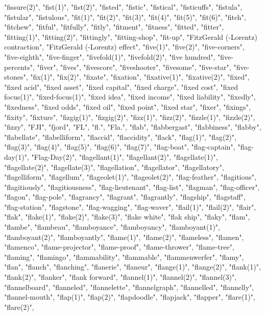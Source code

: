 "fissure(2)",
"fist(1)",
"fist(2)",
"fisted",
"fistic",
"fistical",
"fisticuffs",
"fistula",
"fistular",
"fistulous",
"fit(1)",
"fit(2)",
"fit(3)",
"fit(4)",
"fit(5)",
"fit(6)",
"fitch",
"fitchew",
"fitful",
"fitfully",
"fitly",
"fitment",
"fitness",
"fitted",
"fitter",
"fitting(1)",
"fitting(2)",
"fittingly",
"fitting-shop",
"fit-up",
"FitzGerald (-Lorentz) contraction",
"FitzGerald (-Lorentz) effect",
"five(1)",
"five(2)",
"five-corners",
"five-eighth",
"five-finger",
"fivefold(1)",
"fivefold(2)",
"five hundred",
"five-percents",
"fiver",
"fives",
"fivescore",
"fiveshooter",
"fivesome",
"five-star",
"five-stones",
"fix(1)",
"fix(2)",
"fixate",
"fixation",
"fixative(1)",
"fixative(2)",
"fixed",
"fixed acid",
"fixed asset",
"fixed capital",
"fixed charge",
"fixed cost",
"fixed focus(1)",
"fixed-focus(1)",
"fixed idea",
"fixed income",
"fixed liability",
"fixedly",
"fixedness",
"fixed odds",
"fixed oil",
"fixed point",
"fixed star",
"fixer",
"fixings",
"fixity",
"fixture",
"fizgig(1)",
"fizgig(2)",
"fizz(1)",
"fizz(2)",
"fizzle(1)",
"fizzle(2)",
"fizzy",
"FJI",
"fjord",
"FL",
"fl.",
"Fla.",
"flab",
"flabbergast",
"flabbiness",
"flabby",
"flabellate",
"flabelliform",
"flaccid",
"flaccidity",
"flack",
"flag(1)",
"flag(2)",
"flag(3)",
"flag(4)",
"flag(5)",
"flag(6)",
"flag(7)",
"flag-boat",
"flag-captain",
"flag-day(1)",
"Flag-Day(2)",
"flagellant(1)",
"flagellant(2)",
"flagellate(1)",
"flagellate(2)",
"flagellate(3)",
"flagellation",
"flagellator",
"flagellatory",
"flagelliform",
"flagellum",
"flageolet(1)",
"flageolet(2)",
"flag-feather",
"flagitious",
"flagitiously",
"flagitiousness",
"flag-lieutenant",
"flag-list",
"flagman",
"flag-officer",
"flagon",
"flag-pole",
"flagrancy",
"flagrant",
"flagrantly",
"flagship",
"flagstaff",
"flag-station",
"flagstone",
"flag-wagging",
"flag-waver",
"flail(1)",
"flail(2)",
"flair",
"flak",
"flake(1)",
"flake(2)",
"flake(3)",
"flake white",
"flak ship",
"flaky",
"flam",
"flambe",
"flambeau",
"flamboyance",
"flamboyancy",
"flamboyant(1)",
"flamboyant(2)",
"flamboyantly",
"flame(1)",
"flame(2)",
"flameless",
"flamen",
"flamenco",
"flame-projector",
"flame-proof",
"flame-thrower",
"flame-tree",
"flaming",
"flamingo",
"flammability",
"flammable",
"flammenwerfer",
"flamy",
"flan",
"flanch",
"flanching",
"flanerie",
"flaneur",
"flange(1)",
"flange(2)",
"flank(1)",
"flank(2)",
"flanker",
"flank forward",
"flannel(1)",
"flannel(2)",
"flannel(3)",
"flannelboard",
"flanneled",
"flannelette",
"flannelgraph",
"flannelled",
"flannelly",
"flannel-mouth",
"flap(1)",
"flap(2)",
"flapdoodle",
"flapjack",
"flapper",
"flare(1)",
"flare(2)",

